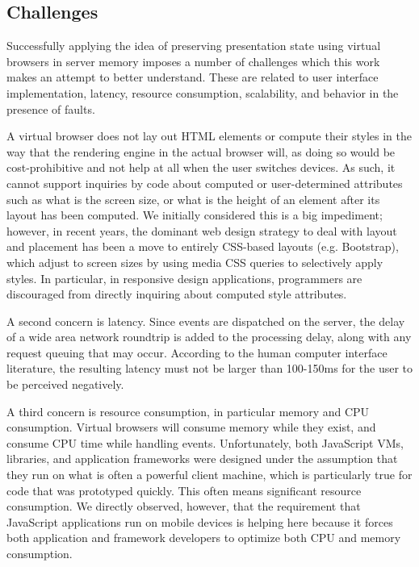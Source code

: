 \architectureoverview{}

\subsection{Challenges}
\webscaleout{}
Successfully applying the idea of preserving presentation state using virtual
browsers in server memory imposes a number of challenges which this work 
makes an attempt to better understand.
These are related to user interface implementation, latency, 
resource consumption, scalability, and behavior in the presence of faults.

A virtual browser does not lay out HTML elements or compute their styles in the
way that the rendering engine in the actual browser will, as doing so would be 
cost-prohibitive and not help at all when the user switches devices.  As such,
it cannot support inquiries by code about computed or user-determined
attributes such as what is the screen size, or what is the height of an
element after its layout has been computed.  We initially considered this is
a big impediment; however, in recent years, the dominant web design strategy
to deal with layout and placement has been a move to entirely CSS-based layouts
(e.g. Bootstrap), which adjust to screen sizes by using media CSS queries
to selectively apply styles.  In particular, in responsive design applications,
programmers are discouraged from directly inquiring about computed style
attributes.

A second concern is latency.  Since events are dispatched on the server,
the delay of a wide area network roundtrip is added to the processing delay,
along with any request queuing that may occur.  According to the human computer
interface literature, the resulting latency must not be larger than 100-150ms 
for the user to be perceived negatively.

A third concern is resource consumption, in particular memory and CPU consumption.
Virtual browsers will consume memory while they exist, and consume CPU time
while handling events.  Unfortunately, both JavaScript VMs, libraries, and
application frameworks were designed under the assumption that they run
on what is often a powerful client machine, which is particularly true for 
code that was prototyped quickly. This often means significant resource 
consumption.  We directly observed, however, that the requirement that JavaScript 
applications run on mobile devices is helping here because it forces both 
application and framework developers to optimize both CPU and memory 
consumption.

